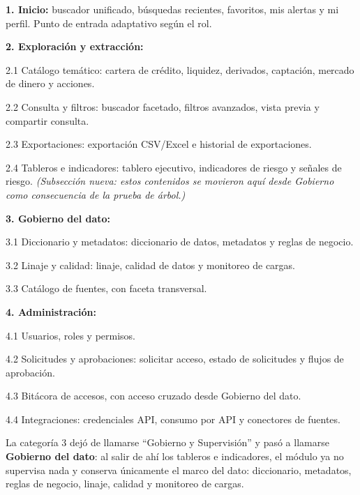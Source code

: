 \begin{uxlist}
  \item \textbf{1. Inicio:} buscador unificado, búsquedas recientes, favoritos, mis alertas y mi perfil. Punto de entrada adaptativo según el rol.
  \item \textbf{2. Exploración y extracción:}
    \begin{uxlist}
      \item 2.1 Catálogo temático: cartera de crédito, liquidez, derivados, captación, mercado de dinero y acciones.
      \item 2.2 Consulta y filtros: buscador facetado, filtros avanzados, vista previa y compartir consulta.
      \item 2.3 Exportaciones: exportación CSV/Excel e historial de exportaciones.
      \item 2.4 Tableros e indicadores: tablero ejecutivo, indicadores de riesgo y señales de riesgo. \textit{(Subsección nueva: estos contenidos se movieron aquí desde Gobierno como consecuencia de la prueba de árbol.)}
    \end{uxlist}
  \item \textbf{3. Gobierno del dato:}
    \begin{uxlist}
      \item 3.1 Diccionario y metadatos: diccionario de datos, metadatos y reglas de negocio.
      \item 3.2 Linaje y calidad: linaje, calidad de datos y monitoreo de cargas.
      \item 3.3 Catálogo de fuentes, con faceta transversal.
    \end{uxlist}
  \item \textbf{4. Administración:}
    \begin{uxlist}
      \item 4.1 Usuarios, roles y permisos.
      \item 4.2 Solicitudes y aprobaciones: solicitar acceso, estado de solicitudes y flujos de aprobación.
      \item 4.3 Bitácora de accesos, con acceso cruzado desde Gobierno del dato.
      \item 4.4 Integraciones: credenciales API, consumo por API y conectores de fuentes.
    \end{uxlist}
\end{uxlist}

La categoría 3 dejó de llamarse ``Gobierno y Supervisión'' y pasó a llamarse \textbf{Gobierno del dato}: al salir de ahí los tableros e indicadores, el módulo ya no supervisa nada y conserva únicamente el marco del dato: diccionario, metadatos, reglas de negocio, linaje, calidad y monitoreo de cargas.

